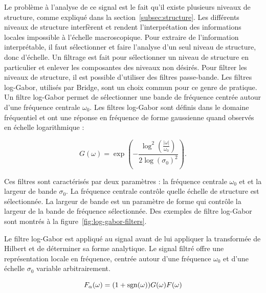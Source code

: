 Le problème à l'analyse de ce signal est le fait qu'il existe plusieurs niveaux de structure, comme expliqué dans la section~\ref{subsec:structure}. Les différents niveaux de structure interfèrent et rendent l'interprétation des informations locales impossible à l'échelle macroscopique. Pour extraire de l'information interprétable, il faut sélectionner et faire l'analyse d'un seul niveau de structure, donc d'échelle. Un filtrage est fait pour sélectionner un niveau de structure en particulier et enlever les composantes des niveaux non désirés. Pour filtrer les niveaux de structure, il est possible d'utiliser des filtres passe-bande. Les filtres log-Gabor, utilisés par Bridge, sont un choix commun pour ce genre de pratique. Un filtre log-Gabor permet de sélectionner une bande de fréquence centrée autour d'une fréquence centrale $\omega_0$. Les filtres log-Gabor sont définis dans le domaine fréquentiel et ont une réponse en fréquence de forme gaussienne quand observés en échelle logarithmique :

\begin{equation}
    G(\omega) = \exp\left(-\frac{\log^2(\frac{|\omega|}{\omega_0})}{2\log(\sigma_0)^2}\right).
\end{equation}

Ces filtres sont caractérisés par deux paramètres : la fréquence centrale $\omega_0$ et et la largeur de bande $\sigma_0$. La fréquence centrale contrôle quelle échelle de structure est sélectionnée. La largeur de bande est un paramètre de forme qui contrôle la largeur de la bande de fréquence sélectionnée. Des exemples de filtre log-Gabor sont montrés à la figure~\ref{fig:log-gabor-filters}.

\bigskip

Le filtre log-Gabor est appliqué au signal avant de lui appliquer la transformée de Hilbert et de déterminer sa forme analytique. Le signal filtré offre une représentation locale en fréquence, centrée autour d'une fréquence $\omega_0$ et d'une échelle $\sigma_0$ variable arbitrairement.

\begin{equation}
    F_{\alpha}(\omega) = (1+\operatorname{sgn}(\omega))G(\omega)F(\omega)
\end{equation}

